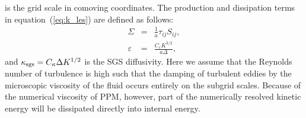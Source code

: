 is the grid scale in comoving coordinates. The production and dissipation terms in equation~(\ref{eq:k_les}) 
are defined as follows:
\begin{eqnarray}
\Sigma             &=& \frac{1}{a}\tau_{ij} S_{ij}, \\
\varepsilon &=& \frac{C_\varepsilon K^{3/2}}{a\Delta},
\end{eqnarray}
and $\kappa_{\rm sgs} = C_{\kappa}\Delta K^{1/2}$ is the SGS diffusivity.
Here we assume that the Reynolds number of turbulence is high such that the damping of turbulent eddies by the microscopic
viscosity of the fluid occurs entirely on the subgrid scales. Because of the numerical viscosity of PPM,
however, part of the numerically resolved kinetic energy will be dissipated directly into internal energy.

